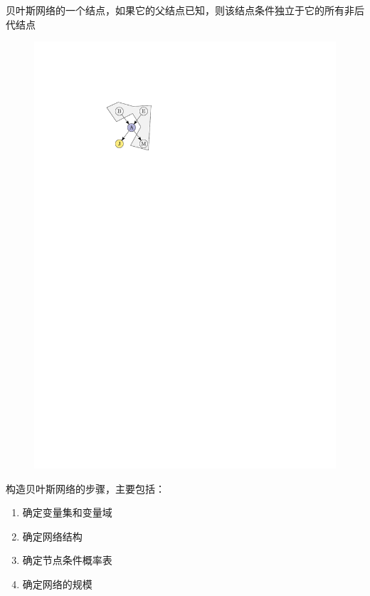 \begin{note}
\begin{itemize}
        贝叶斯网络的一个结点，如果它的父结点已知，则该结点条件独立于它的所有非后代结点
        \begin{figure}[htbp]
            \centering
            \includegraphics{image/贝叶斯网络局部语法语义.pdf}
        \end{figure}
    \end{itemize}
\end{note}
\begin{example}
    构造贝叶斯网络的步骤，主要包括：
    \begin{enumerate}[A]
        \item \textcolor{main1}{确定变量集和变量域}
        \item \textcolor{main1}{确定网络结构}
        \item \textcolor{main1}{确定节点条件概率表}
        \item 确定网络的规模
    \end{enumerate}
\end{example}
